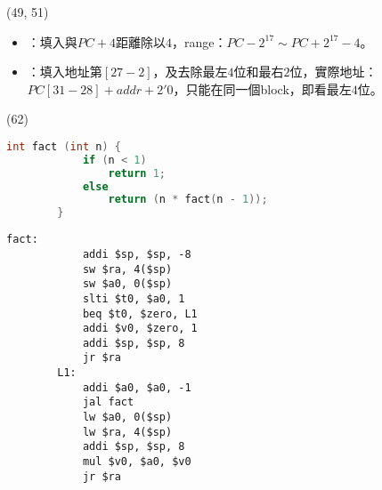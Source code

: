 \item \begin{theorem}{(49, 51)} \quad\quad \begin{itemize}
        \item {}：填入與$PC + 4$距離除以$4$，range：$PC - 2^{17} \sim PC + 2^{17} - 4$。
        \item {}：填入地址第$[27 - 2]$，及去除最左$4$位和最右$2$位，實際地址：$PC[31 - 28] + addr + 2'0$，只能在同一個block，即看最左$4$位。
    \end{itemize}
\end{theorem}

\item \begin{theorem}{(62)} \quad\quad \begin{lstlisting}[language={C}]
        int fact (int n) {
            if (n < 1)
                return 1;
            else
                return (n * fact(n - 1));            
        }
    \end{lstlisting}
    \begin{lstlisting}[language={[x86masm]Assembler}]
        fact:
            addi $sp, $sp, -8
            sw $ra, 4($sp)
            sw $a0, 0($sp)
            slti $t0, $a0, 1
            beq $t0, $zero, L1
            addi $v0, $zero, 1
            addi $sp, $sp, 8
            jr $ra
        L1:
            addi $a0, $a0, -1
            jal fact
            lw $a0, 0($sp)
            lw $ra, 4($sp)
            addi $sp, $sp, 8
            mul $v0, $a0, $v0
            jr $ra
    \end{lstlisting}
\end{theorem}
